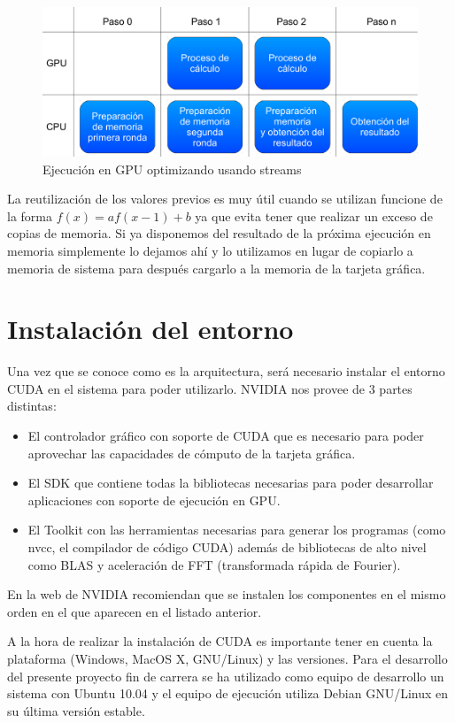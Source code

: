 \begin{figure}
	\centering
	\includegraphics[width=1\textwidth]{images/ejec_gpu_complex.pdf}
	\caption{Ejecución en GPU optimizando usando streams}\label{fig:cudaejecavanzada}
\end{figure}

La reutilización de los valores previos es muy útil cuando se utilizan funcione de la forma $f(x) = af(x-1)+b$ ya que evita tener que realizar un exceso de copias de memoria. Si ya disponemos del resultado de la próxima ejecución en memoria simplemente lo dejamos ahí y lo utilizamos en lugar de copiarlo a memoria de sistema para después cargarlo a la memoria de la tarjeta gráfica.

\section{Instalación del entorno}

Una vez que se conoce como es la arquitectura, será necesario instalar el entorno CUDA en el sistema para poder utilizarlo. NVIDIA nos provee de 3 partes distintas:

\begin{itemize}
	\item El controlador gráfico con soporte de CUDA que es necesario para poder aprovechar las capacidades de cómputo de la tarjeta gráfica.
	\item El SDK que contiene todas la bibliotecas necesarias para poder desarrollar aplicaciones con soporte de ejecución en GPU.
	\item El Toolkit con las herramientas necesarias para generar los programas (como nvcc, el compilador de código CUDA) además de bibliotecas de alto nivel como BLAS y aceleración de FFT (transformada rápida de Fourier).
\end{itemize}

En la web de NVIDIA recomiendan que se instalen los componentes en el mismo orden en el que aparecen en el listado anterior.

A la hora de realizar la instalación de CUDA es importante tener en cuenta la plataforma (Windows, MacOS X, GNU/Linux) y las versiones. Para el desarrollo del presente proyecto fin de carrera se ha utilizado como equipo de desarrollo un sistema con Ubuntu 10.04 y el equipo de ejecución utiliza Debian GNU/Linux en su última versión estable.
